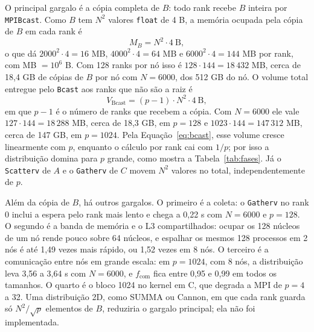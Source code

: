 \documentclass[Portugues]{ic-tese-v3}
\DeclareRobustCommand{\_}{\textunderscore\allowbreak} %
\begin{document}
O principal gargalo é a cópia completa de $B$: todo rank recebe $B$ inteira por \texttt{MPI\_Bcast}. Como $B$ tem $N^2$ valores \texttt{float} de 4 B, a memória ocupada pela cópia de $B$ em cada rank é
\begin{equation}\label{eq:memB}
M_B = N^2 \cdot 4\ \mathrm{B},
\end{equation}
o que dá $2000^2\cdot4 = 16$ MB, $4000^2\cdot4 = 64$ MB e $6000^2\cdot4 = 144$ MB por rank, com MB $=10^6$ B. Com 128 ranks por nó isso é $128\cdot144 = 18\,432$ MB, cerca de 18,4 GB de cópias de $B$ por nó com $N=6000$, dos 512 GB do nó. O volume total entregue pelo \texttt{Bcast} aos ranks que não são a raiz é
\begin{equation}\label{eq:bcast}
V_{\mathrm{Bcast}} = (p-1) \cdot N^2 \cdot 4\ \mathrm{B},
\end{equation}
em que $p-1$ é o número de ranks que recebem a cópia. Com $N=6000$ ele vale $127\cdot144 = 18\,288$ MB, cerca de 18,3 GB, em $p=128$ e $1023\cdot144 = 147\,312$ MB, cerca de 147 GB, em $p=1024$. Pela Equação~\eqref{eq:bcast}, esse volume cresce linearmente com $p$, enquanto o cálculo por rank cai com $1/p$; por isso a distribuição domina para $p$ grande, como mostra a Tabela~\ref{tab:fases}. Já o \texttt{Scatterv} de $A$ e o \texttt{Gatherv} de $C$ movem $N^2$ valores no total, independentemente de $p$.

Além da cópia de $B$, há outros gargalos. O primeiro é a coleta: o \texttt{Gatherv} no rank 0 inclui a espera pelo rank mais lento e chega a 0,22 s com $N=6000$ e $p=128$. O segundo é a banda de memória e o L3 compartilhados: ocupar os 128 núcleos de um nó rende pouco sobre 64 núcleos, e espalhar os mesmos 128 processos em 2 nós é até 1,49 vezes mais rápido, ou 1,52 vezes em 8 nós. O terceiro é a comunicação entre nós em grande escala: em $p=1024$, com 8 nós, a distribuição leva 3,56 a 3,64 s com $N=6000$, e $f_{\mathrm{com}}$ fica entre 0,95 e 0,99 em todos os tamanhos. O quarto é o bloco 1024 no kernel em C, que degrada a MPI de $p=4$ a 32. Uma distribuição 2D, como SUMMA ou Cannon, em que cada rank guarda só $N^2/\sqrt{p}$ elementos de $B$, reduziria o gargalo principal; ela não foi implementada.
\end{document}
